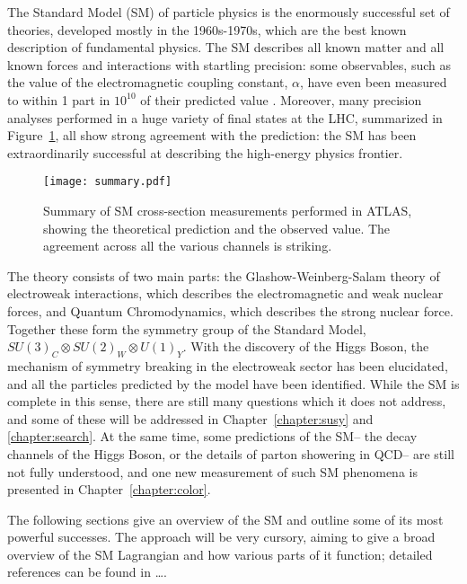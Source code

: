 \label{chapter:sm}

The Standard Model (SM) of particle physics is the enormously successful set of theories, developed mostly in the 1960s-1970s, which are the best known description of fundamental physics. The SM describes all known matter and all known forces and interactions with startling precision: some observables, such as the value of the electromagnetic coupling constant, $\alpha$, have even been measured to within 1 part in $10^{10}$ of their predicted value . Moreover, many precision analyses performed in a huge variety of final states at the LHC, summarized in Figure~\ref{fig:sm:summary}, all show strong agreement with the prediction: the SM has been extraordinarily successful at describing the high-energy physics frontier.


\begin{figure}
\centering
\texttt{[image: summary.pdf]}
\label{fig:sm:summary}
\caption{Summary of SM cross-section measurements performed in ATLAS, showing the theoretical prediction and the observed value. The agreement across all the various channels is striking.}
\end{figure}


The theory consists of two main parts: the Glashow-Weinberg-Salam theory of electroweak interactions, which describes the electromagnetic and weak nuclear forces, and Quantum Chromodynamics, which describes the strong nuclear force. Together these form the symmetry group of the Standard Model, $SU(3)_C \otimes SU(2)_W \otimes U(1)_Y$. With the discovery of the Higgs Boson, the mechanism of symmetry breaking in the electroweak sector has been elucidated, and all the particles predicted by the model have been identified. While the SM is complete in this sense, there are still many questions which it does not address, and some of these will be addressed in Chapter~\ref{chapter:susy} and \ref{chapter:search}. At the same time, some predictions of the SM-- the decay channels of the Higgs Boson, or the details of parton showering in QCD-- are still not fully understood, and one new measurement of such SM phenomena is presented in Chapter~\ref{chapter:color}.

The following sections give an overview of the SM and outline some of its most powerful successes. The approach will be very cursory, aiming to give a broad overview of the SM Lagrangian and how various parts of it function; detailed references can be found in \ldots. 



